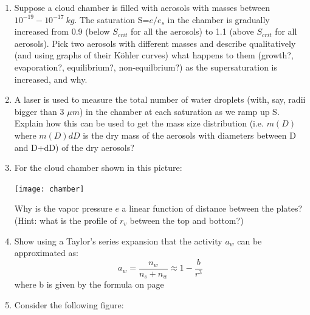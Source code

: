 \documentclass[12pt]{article}
\begin{document}
\begin{enumerate}
\item Suppose a cloud chamber is filled with aerosols with masses
between $10^{-19} - 10^{-17}\ kg$.   The saturation S=$e/e_s$ in the
chamber is gradually increased from 0.9 (below $S_{crit}$ for all the
aerosols) to 1.1 (above $S_{crit}$ for all aerosols).  Pick two
aerosols with different masses and describe qualitatively (and using
graphs of their K\"ohler curves) what happens to them
(growth?, evaporation?, equilibrium?, non-equilbrium?)  as the
supersaturation is increased, and why.

\item A laser is used to measure the total number of water droplets
(with, say, radii bigger than 3 $\mu m$) in the
chamber at each saturation as we ramp up S.  Explain how this can be used to
get the mass size distribution (i.e. $m(D)$ where $m(D)dD$ is the dry
mass of the aerosols with diameters between D and D+dD) of the dry
aerosols?


\item For the cloud chamber shown in this picture:

\texttt{[image: chamber]}

Why is the vapor pressure $e$ a linear function of distance between
the plates?  (Hint:  what is the profile of $r_v$ between the top
and bottom?)

\item  Show using a Taylor's series expansion that the activity $a_w$ can be approximated as: 
  \begin{equation}
    \label{eq:aw}
    a_w = \frac{n_w}{n_s + n_w} \approx 1 - \frac{b}{r^3}
  \end{equation}
where b is given by the formula on page~\pageref{constants}



\item Consider the following figure:

\vspace{-1in}


\end{enumerate}
\end{document}
